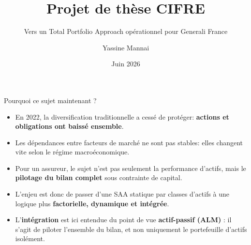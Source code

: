 \documentclass[aspectratio=169,11pt]{beamer}
\title[Thèse CIFRE]{Projet de thèse CIFRE}
\subtitle{Vers un Total Portfolio Approach opérationnel pour Generali France}
\author[Y. Mannai]{Yassine Mannai}
\institute[Generali France]{Generali France \\ Université Paris Dauphine-PSL}
\date[Juin 2026]{Juin 2026}
\newcommand{\highlight}[1]{\textcolor{GeneraliRed}{\textbf{#1}}}
\begin{document}
\begin{frame}
  \titlepage
\end{frame}

\begin{frame}{Pourquoi ce sujet maintenant ?}
  \begin{itemize}
    \item En 2022, la diversification traditionnelle a cessé de protéger: \highlight{actions et obligations ont baissé ensemble}.
    \item Les dépendances entre facteurs de marché ne sont pas stables: elles changent vite selon le régime macroéconomique.
    \item Pour un assureur, le sujet n'est pas seulement la performance d'actifs, mais le \highlight{pilotage du bilan complet} sous contrainte de capital.
    \item L'enjeu est donc de passer d'une SAA statique par classes d'actifs à une logique plus \highlight{factorielle, dynamique et intégrée}.
    \item L'\highlight{intégration} est ici entendue du point de vue \highlight{actif-passif (ALM)} : il s'agit de piloter l'ensemble du bilan, et non uniquement le portefeuille d'actifs isolément.
  \end{itemize}
\end{frame}
\end{document}

